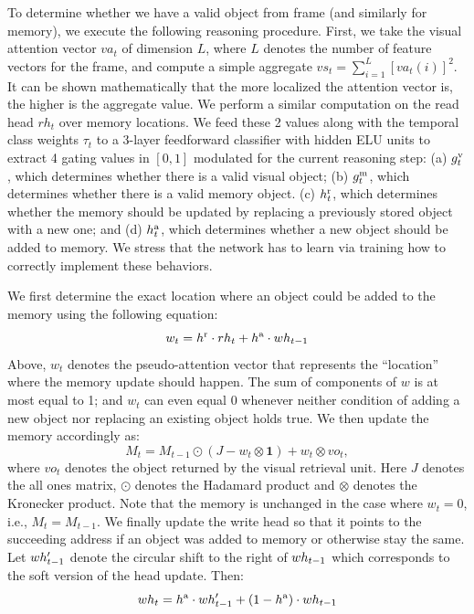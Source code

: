 To determine whether we have a valid object from frame (and similarly for memory), we execute the following reasoning procedure.
First, we take the visual attention vector $va_t$ of dimension $L$, where $L$ denotes the number of feature vectors for the frame,
and compute a simple aggregate $vs_t = \sum_{i=1}^L [va_t(i)]^2$. It can be shown mathematically that the more localized the attention
vector is, the higher is the aggregate value.
We perform a similar computation on the read head $rh_t$ over memory locations.
We feed these 2 values along with the temporal class weights $\tau_t$ to a 3-layer feedforward classifier with hidden ELU units to extract 4 gating values
in $[0,1]$ modulated for the current reasoning step:
(a) $g^{\mathrm{v}}_t$, which determines whether there is a valid visual object;
(b) $g^{\mathrm{m}}_t$, which determines whether there is a valid memory object. 
(c) $h^{\mathrm{r}}_t$, which determines whether the memory should be updated by replacing a previously stored object with a new one; and
(d) $h^{\mathrm{a}}_t$, which determines whether a new object should be added to memory.
We stress that the network has to learn via training how to correctly implement these behaviors.

We first determine the exact location where an object could be added to the memory using the following equation:
\[ w_t = h^{\mathrm{r}} \cdot rh_t + h^{\mathrm{a}} \cdot wh_{t-1} \]
Above, $w_t$ denotes the pseudo-attention vector that represents the ``location'' where the memory update should happen.
The sum of components of $w$ is at most equal to 1; and $w_t$ can even equal 0 whenever neither condition
of adding a new object nor replacing an existing object holds true.
We then update the memory accordingly as:
\[ M_t = M_{t-1} \odot (J - w_t \otimes \mathbf{1}) + w_t \otimes vo_t,\]
where $vo_t$ denotes the object returned by the visual retrieval unit. 
Here $J$ denotes the all ones matrix, $\odot$ denotes the Hadamard product and $\otimes$ denotes the Kronecker product. 
Note that the memory is unchanged in the case where $w_t = 0$, i.e., $M_t = M_{t-1}$.
We finally update the write head so that it points to the succeeding address if an object was added to memory or otherwise stay the same.
Let $wh'_{t-1}$ denote the circular shift to the right of $wh_{t-1}$ which corresponds to the soft version of the head update.
Then:
\[ wh_t = h^{\mathrm{a}} \cdot wh'_{t-1} + (1-h^{\mathrm{a}}) \cdot wh_{t-1} \]

